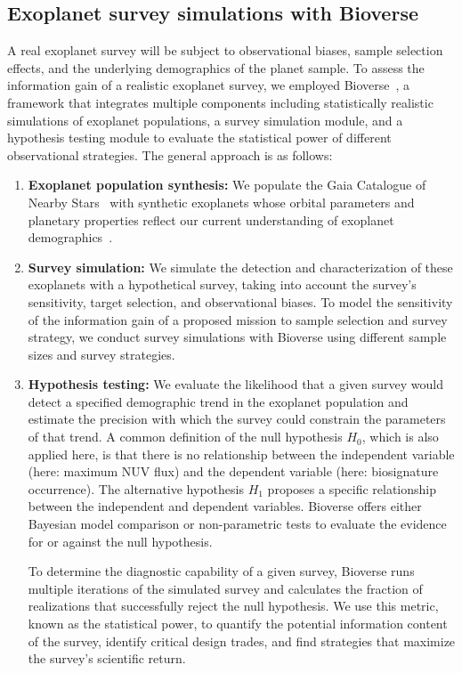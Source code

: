 \documentclass[twocolumn,twocolappendix,linenumbers]{aastex631}
\begin{document}
\subsection{Exoplanet survey simulations with Bioverse}
A real exoplanet survey will be subject to observational biases, sample selection effects, and the underlying demographics of the planet sample.
To assess the information gain of a realistic exoplanet survey, we employed Bioverse~\citep{Bixel2021}, a framework that integrates multiple components including statistically realistic simulations of exoplanet populations, a survey simulation module, and a hypothesis testing module to evaluate the statistical power of different observational strategies.
The general approach is as follows:
\begin{enumerate}
\item \textbf{Exoplanet population synthesis:} We populate the Gaia Catalogue of Nearby Stars~\citep{Smart2021} with synthetic exoplanets whose orbital parameters and planetary properties reflect our current understanding of exoplanet demographics~\citep{Bergsten2022}.
    \item \textbf{Survey simulation:} We simulate the detection and characterization of these exoplanets with a hypothetical survey, taking into account the survey's sensitivity, target selection, and observational biases.
To model the sensitivity of the information gain of a proposed mission to sample selection and survey strategy, we conduct survey simulations with Bioverse using different sample sizes and survey strategies.
    \item \textbf{Hypothesis testing:} We evaluate the likelihood that a given survey would detect a specified demographic trend in the exoplanet population and estimate the precision with which the survey could constrain the parameters of that trend.
    A common definition of the null hypothesis $H_0$, which is also applied here, is that there is no relationship between the independent variable (here: maximum NUV flux) and the dependent variable (here: biosignature occurrence).
    The alternative hypothesis $H_1$ proposes a specific relationship between the independent and dependent variables.
    Bioverse offers either Bayesian model comparison or non-parametric tests to evaluate the evidence for or against the null hypothesis.

To determine the diagnostic capability of a given survey, Bioverse runs multiple iterations of the simulated survey and calculates the fraction of realizations that successfully reject the null hypothesis.
We use this metric, known as the statistical power, to quantify the potential information content of the survey, identify critical design trades, and find strategies that maximize the survey's scientific return.
\end{enumerate}
\end{document}
